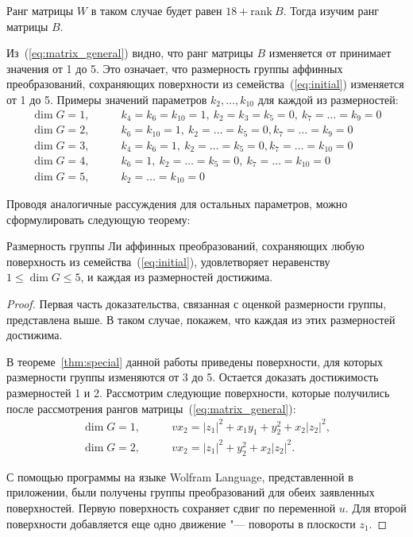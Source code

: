 \documentclass[../main.tex]{subfiles}
\begin{document}
Ранг матрицы $W$ в таком случае будет равен $18 + \mathrm{rank}~B$. Тогда изучим ранг матрицы $B$.

Из~(\ref{eq:matrix_general}) видно, что ранг матрицы $B$ изменяется от принимает значения от 1 до 5. Это означает, что размерность группы аффинных преобразований, сохраняющих поверхности из семейства~(\ref{eq:initial}) изменяется от 1 до 5. Примеры значений параметров $k_2,\hdots,k_{10}$ для каждой из размерностей:
\begin{align*}
\dim G = 1,&\qquad k_4 = k_6 = k_{10} = 1,~k_2 = k_3 = k_5 = 0,~k_7 = \hdots = k_9 = 0 \\
\dim G = 2,&\qquad k_6 = k_{10} = 1,~k_2 = \hdots = k_5 = 0, k_7 = \hdots = k_9 = 0 \\
\dim G = 3,&\qquad k_4 = k_6 = 1,~k_2 = \hdots = k_5 = 0, k_7 = \hdots = k_{10} = 0 \\
\dim G = 4,&\qquad k_6 = 1,~k_2 = \hdots = k_5 = 0,~k_7 = \hdots = k_{10} = 0 \\
\dim G = 5,&\qquad k_2 = \hdots = k_{10} = 0
\end{align*}

Проводя аналогичные рассуждения для остальных параметров, можно сформулировать следующую теорему:

\begin{theorem}\label{thm:main} Размерность группы Ли аффинных преобразований, сохраняющих любую поверхность из семейства~(\ref{eq:initial}), удовлетворяет неравенству $1 \le \dim G \le 5$, и каждая из размерностей достижима.
\end{theorem}
\begin{proof}
Первая часть доказательства, связанная с оценкой размерности группы, представлена выше. В таком случае, покажем, что каждая из этих размерностей достижима.

В теореме~\ref{thm:special} данной работы приведены поверхности, для которых размерности группы изменяются от 3 до 5. Остается доказать достижимость размерностей 1 и 2. Рассмотрим следующие поверхности, которые получились после рассмотрения рангов матрицы~(\ref{eq:matrix_general}):
\begin{align}
\dim G = 1, &\qquad v x_2 = {|z_1|}^2 + x_1 y_1 + y_2 ^2 + x_2 {|z_2|}^2, \label{eq:general_1}\\
\dim G = 2, &\qquad v x_2 = {|z_1|}^2 + y_2^2 + x_2 {|z_2|}^2.\label{eq:general_2}
\end{align}

С помощью программы на языке {\ttfamily Wolfram Language}, представленной в приложении, были получены группы преобразований для обеих заявленных поверхностей. Первую поверхность сохраняет сдвиг по переменной $u$. Для второй поверхности добавляется еще одно движение "--- повороты в плоскости $z_1$.
\end{proof}
\end{document}

